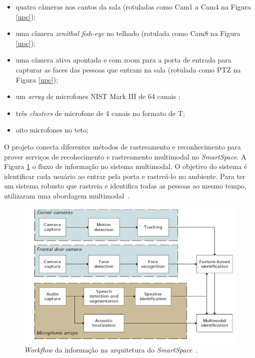 	\begin{itemize}
		\item quatro câmeras nos cantos da sala (rotuladas como Cam1 a Cam4 na Figura \ref{upc});
		\item uma câmera \textit{zenithal fish-eye} no telhado (rotulada como Cam8 na Figura \ref{upc});
		\item uma câmera ativa apontada e com zoom para a porta de entrada para capturar as faces das pessoas que entram na sala (rotulada como PTZ na Figura \ref{upc});
		\item um \textit{array} de microfones NIST Mark III de 64 canais ;
		\item três \textit{clusters} de microfone de 4 canais no formato de T;
		\item oito microfones no teto;
	\end{itemize}

O projeto conecta diferentes métodos de rastreamento e reconhecimento para prover serviços de recohecimento e rastreamento multimodal no \textit{SmartSpace}. A Figura \ref{workflow} o fluxo de informação no sistema multimodal. O objetivo do sistema é identificar cada usuário ao entrar pela porta e rastreá-lo no ambiente. Para ter um sistema robusto que rastreia e identifica todas as pessoas ao mesmo tempo, utilizaram uma abordagem multimodal~\cite{salah}.

\begin{figure}[hbt]
		\begin{center}
			\includegraphics[scale=0.5]{figuras/3.TrabalhosCorrelatos/workflow.png}
		\end{center}
		\caption{\textit{Workflow} da informação na arquitetura do \textit{SmartSpace}~\cite{salah}.}
		\label{workflow}
	\end{figure}


